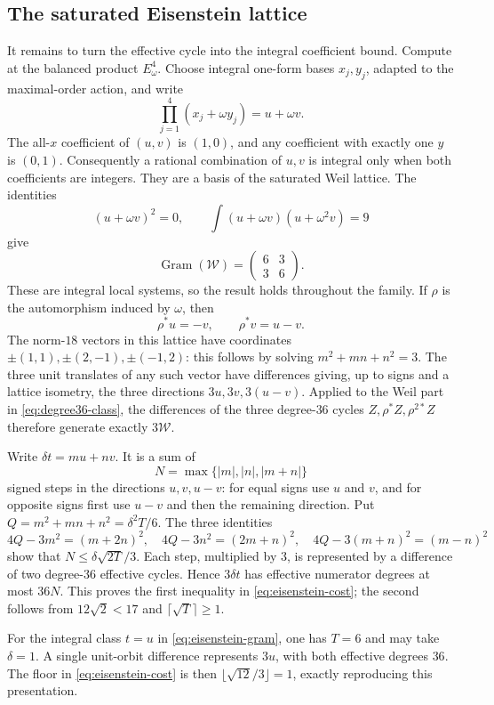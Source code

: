 \subsection{The saturated Eisenstein lattice}

It remains to turn the effective cycle into the integral coefficient bound. Compute at the balanced product $E_\omega^4$. Choose integral one-form bases $x_j,y_j$, adapted to the maximal-order action, and write
\[
 \prod_{j=1}^4(x_j+\omega y_j)=u+\omega v.
\]
The all-$x$ coefficient of $(u,v)$ is $(1,0)$, and any coefficient with exactly one $y$ is $(0,1)$. Consequently a rational combination of $u,v$ is integral only when both coefficients are integers. They are a basis of the saturated Weil lattice. The identities
\[
 (u+\omega v)^2=0,\qquad
 \int(u+\omega v)(u+\omega^2v)=9
\]
give
\begin{equation}\label{eq:eisenstein-gram}
 \operatorname{Gram}(\mathcal W)=
 \begin{pmatrix}6&3\\3&6\end{pmatrix}.
\end{equation}
These are integral local systems, so the result holds throughout the family. If $\rho$ is the automorphism induced by $\omega$, then
\[
 \rho^*u=-v,\qquad \rho^*v=u-v.
\]
The norm-$18$ vectors in this lattice have coordinates
$\pm(1,1),\pm(2,-1),\pm(-1,2)$: this follows by solving
$m^2+mn+n^2=3$. The three unit translates of any such vector have differences giving, up to signs and a lattice isometry, the three directions $3u,3v,3(u-v)$. Applied to the Weil part in \eqref{eq:degree36-class}, the differences of the three degree-$36$ cycles
$Z,\rho^*Z,\rho^{2*}Z$ therefore generate exactly $3\mathcal W$.

Write $\delta t=mu+nv$. It is a sum of
\[
 N=\max\{|m|,|n|,|m+n|\}
\]
signed steps in the directions $u,v,u-v$: for equal signs use $u$ and $v$, and for opposite signs first use $u-v$ and then the remaining direction. Put $Q=m^2+mn+n^2=\delta^2T/6$. The three identities
\[
 4Q-3m^2=(m+2n)^2,\quad
 4Q-3n^2=(2m+n)^2,\quad
 4Q-3(m+n)^2=(m-n)^2
\]
show that $N\leq\delta\sqrt{2T}/3$. Each step, multiplied by $3$, is represented by a difference of two degree-$36$ effective cycles. Hence $3\delta t$ has effective numerator degrees at most $36N$. This proves the first inequality in \eqref{eq:eisenstein-cost}; the second follows from $12\sqrt2<17$ and $\lceil\sqrt T\rceil\geq1$.

\begin{example}
For the integral class $t=u$ in \eqref{eq:eisenstein-gram}, one has $T=6$ and may take $\delta=1$. A single unit-orbit difference represents $3u$, with both effective degrees $36$. The floor in \eqref{eq:eisenstein-cost} is then $\lfloor\sqrt{12}/3\rfloor=1$, exactly reproducing this presentation.
\end{example}
